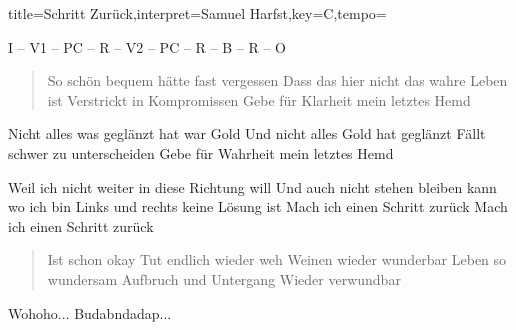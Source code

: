 \documentclass{leadsheet-modern}
\begin{document}
\begin{song}{title={Schritt Zurück},interpret={Samuel Harfst},key={C},tempo={}}

\begin{schedule}
I -- V1 -- PC -- R -- V2 -- PC -- R -- B -- R -- O
\end{schedule}

\begin{verse}
So schön bequem hätte fast vergessen
Dass das hier nicht das wahre Leben ist
Verstrickt in Kompromissen
Gebe für Klarheit mein letztes Hemd
\end{verse}

\begin{prechorus}
Nicht alles was geglänzt hat war Gold
Und nicht alles Gold hat geglänzt
Fällt schwer zu unterscheiden
Gebe für Wahrheit mein letztes Hemd
\end{prechorus}

\begin{chorus}
Weil ich nicht weiter in diese Richtung will
Und auch nicht stehen bleiben kann wo ich bin
Links und rechts keine Lösung ist
Mach ich einen Schritt zurück
Mach ich einen Schritt zurück
\end{chorus}

\begin{verse}
Ist schon okay
Tut endlich wieder weh
Weinen wieder wunderbar
Leben so wundersam
Aufbruch und Untergang
Wieder verwundbar
\end{verse}

\begin{bridge}
Wohoho...
Budabndadap...
\end{bridge}

\end{song}
\end{document}

